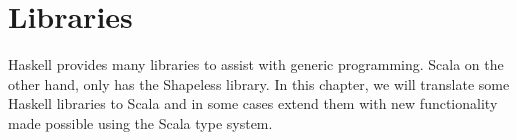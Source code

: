 \chapter{Libraries}
\label{libraries}

Haskell provides many libraries to assist with generic programming. Scala on
the other hand, only has the Shapeless library. In this chapter, we will
translate some Haskell libraries to Scala and in some cases extend them with
new functionality made possible using the Scala type system.





